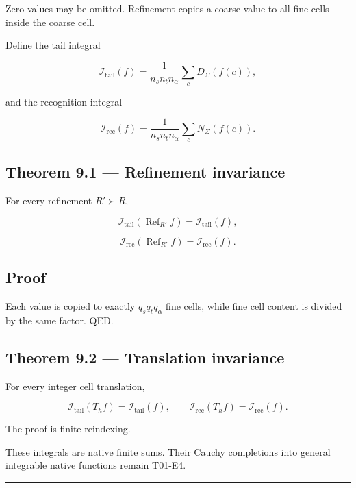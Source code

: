 Zero values may be omitted. Refinement copies a coarse value to all fine cells
inside the coarse cell.

Define the tail integral

\[
\boxed{
\mathcal I_{\mathrm{tail}}(f)
=
\frac{1}{n_sn_tn_\alpha}
\sum_{c}D_\Sigma(f(c)),
}
\tag{9.2}
\]

and the recognition integral

\[
\boxed{
\mathcal I_{\mathrm{rec}}(f)
=
\frac{1}{n_sn_tn_\alpha}
\sum_c N_\Sigma(f(c)).
}
\tag{9.3}
\]

\hypertarget{theorem-9.1-refinement-invariance}{%
\subsection{Theorem 9.1 --- Refinement invariance}\label{theorem-9.1-refinement-invariance}}

For every refinement \(R'\succ R\),

\[
\mathcal I_{\mathrm{tail}}(\operatorname{Ref}_{R'}f)
=
\mathcal I_{\mathrm{tail}}(f),
\tag{9.4}
\]

\[
\mathcal I_{\mathrm{rec}}(\operatorname{Ref}_{R'}f)
=
\mathcal I_{\mathrm{rec}}(f).
\tag{9.5}
\]

\hypertarget{proof-5}{%
\subsection{Proof}\label{proof-5}}

Each value is copied to exactly \(q_sq_tq_\alpha\) fine cells, while fine cell
content is divided by the same factor. QED.

\hypertarget{theorem-9.2-translation-invariance}{%
\subsection{Theorem 9.2 --- Translation invariance}\label{theorem-9.2-translation-invariance}}

For every integer cell translation,

\[
\mathcal I_{\mathrm{tail}}(T_hf)
=
\mathcal I_{\mathrm{tail}}(f),
\qquad
\mathcal I_{\mathrm{rec}}(T_hf)
=
\mathcal I_{\mathrm{rec}}(f).
\tag{9.6}
\]

The proof is finite reindexing.

These integrals are native finite sums. Their Cauchy completions into general
integrable native functions remain T01-E4.

\begin{center}\rule{0.5\linewidth}{0.5pt}\end{center}

